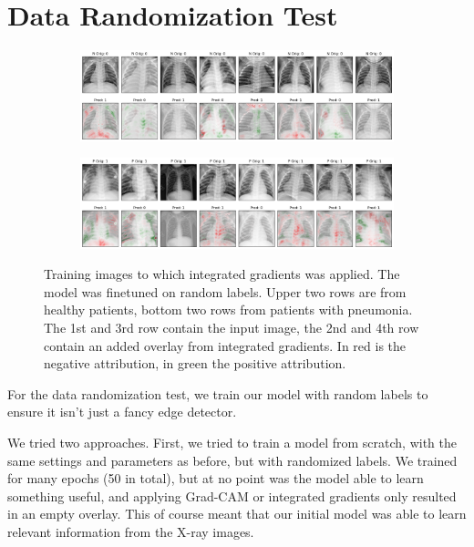 \section{Data Randomization Test}

\begin{figure}
    \centering
    \begin{subfigure}{\textwidth}
        \includegraphics[width=1\textwidth]{images/ig_rand_train.png}
    \end{subfigure}
    \centering
    \begin{subfigure}{\textwidth}
        \includegraphics[width=1\textwidth]{images/ig_rand_train_P.png}
    \end{subfigure}
    \caption{Training images to which integrated gradients was applied. The model was finetuned on random labels. Upper two rows are from healthy patients, bottom two rows from patients with pneumonia. The 1st and 3rd row contain the input image, the 2nd and 4th row contain an added overlay from integrated gradients. In red is the negative attribution, in green the positive attribution.}
    \label{fig:ig_rand_train}
\end{figure}

For the data randomization test, we train our model with random labels to ensure it isn't just a fancy edge detector.

We tried two approaches. First, we tried to train a model from scratch, with the same settings and parameters as before, but with randomized labels. We trained for many epochs (50 in total), but at no point was the model able to learn something useful, and applying Grad-CAM or integrated gradients only resulted in an empty overlay. This of course meant that our initial model was able to learn relevant information from the X-ray images.

